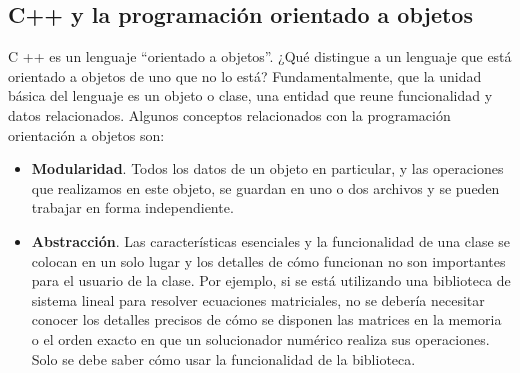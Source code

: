 \subsection{C++ y la programación orientado a objetos}

C ++ es un lenguaje ``orientado a objetos''. ¿Qué distingue a un lenguaje que está orientado a objetos de uno que no lo está? Fundamentalmente, que la unidad básica del lenguaje es un objeto o clase, una entidad que reune funcionalidad y datos relacionados. Algunos conceptos relacionados con la programación orientación a objetos son:

\begin{itemize}

\item \textbf{Modularidad}. Todos los datos de un objeto en particular, y las operaciones que realizamos en este objeto, se guardan en uno o dos archivos y se pueden trabajar en forma independiente.
\item \textbf{Abstracción}. Las características esenciales y la funcionalidad de una clase se colocan en un solo lugar y los detalles de cómo funcionan no son importantes para el usuario de la clase. Por ejemplo, si se está utilizando una biblioteca de sistema lineal para resolver ecuaciones matriciales, no se debería necesitar conocer los detalles precisos de cómo se disponen las matrices en la memoria o el orden exacto en que un solucionador numérico realiza sus operaciones. Solo se debe saber cómo usar la funcionalidad de la biblioteca. 

\newpage


\end{itemize}
